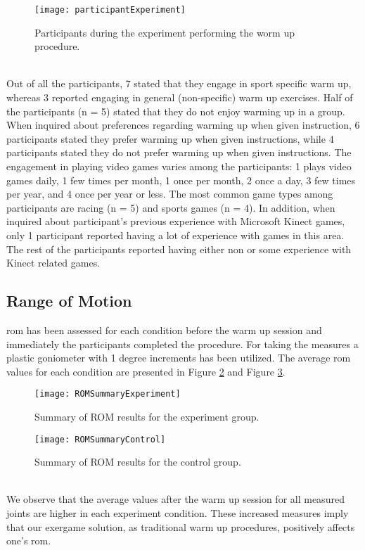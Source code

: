 \begin{figure}[h]
    \centering
    \texttt{[image: participantExperiment]}
    \caption{Participants during the experiment performing the worm up procedure.}
    \label{fig:participants}
\end{figure}\\
Out of all the participants, 7 stated that they engage in sport specific warm up, whereas 3 reported engaging in general  (non-specific) warm up exercises. Half of the participants (n = 5) stated that they do not enjoy warming up in a group. When inquired about preferences regarding warming up when given instruction, 6 participants stated they prefer warming up when given instructions, while 4 participants stated they do not prefer warming up when given instructions. The engagement in playing video games varies among the participants: 1 plays video games daily, 1 few times per month, 1 once per month, 2 once a day, 3 few times per year, and 4 once per year or less. The most common game types among participants are racing (n = 5) and sports games (n = 4). In addition, when inquired about participant's previous experience with Microsoft Kinect games, only 1 participant reported having a lot of experience with games in this area. The rest of the participants reported having either non or some experience with Kinect related games.\pagebreak

\subsection{Range of Motion}
\gls{rom} has been assessed  for each condition before the warm up session and immediately the participants completed the procedure. For taking the measures a plastic goniometer with 1 degree increments has been utilized. The average \acrshort{rom} values for each condition are presented in Figure \ref{fig:romExperiment} and Figure \ref{fig:romControl}.
\begin{figure}[h]
    \centering
    \texttt{[image: ROMSummaryExperiment]}
    \caption{Summary of ROM results for the experiment group.}
    \label{fig:romExperiment}
\end{figure}
\begin{figure}[h]
    \centering
    \texttt{[image: ROMSummaryControl]}
    \caption{Summary of ROM results for the control group.}
    \label{fig:romControl}
\end{figure}\\
We observe that the average values after the warm up session for all measured joints are higher in each experiment condition. These increased measures imply that our exergame solution, as traditional warm up procedures, positively affects one's \acrshort{rom}.
